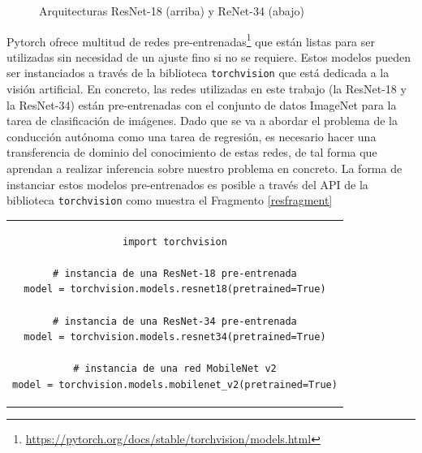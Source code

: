 \begin{figure}
	\begin{center}
		\hspace{0.1cm}
	\end{center}
	\centering
	\captionsetup{justification=centering,margin=2cm}
	\caption{Arquitecturas ResNet-18 (arriba) y ReNet-34 (abajo)}
	\label{fig:resnets}
\end{figure}

Pytorch ofrece multitud de redes pre-entrenadas\footnote{\url{https://pytorch.org/docs/stable/torchvision/models.html}} que están listas para ser utilizadas sin necesidad de un ajuste fino si no se requiere. Estos modelos pueden ser instanciados a través de la biblioteca \texttt{torchvision} que está dedicada a la visión artificial. En concreto, las redes utilizadas en este trabajo (la ResNet-18 y la ResNet-34) están pre-entrenadas con el conjunto de datos ImageNet para la tarea de clasificación de imágenes. Dado que se va a abordar el problema de la conducción autónoma como una tarea de regresión, es necesario hacer una transferencia de dominio del conocimiento de estas redes, de tal forma que aprendan a realizar inferencia sobre nuestro problema en concreto. La forma de instanciar estos modelos pre-entrenados es posible a través del API de la biblioteca \texttt{torchvision} como muestra el Fragmento \ref{resfragment}

\begin{tabular}{c}
\begin{lstlisting}[caption={Ejemplo de instanciación de diferentes modelos pre-entrenados.},captionpos=b,label=resfragment,style=Python] 
import torchvision

# instancia de una ResNet-18 pre-entrenada
model = torchvision.models.resnet18(pretrained=True)

# instancia de una ResNet-34 pre-entrenada
model = torchvision.models.resnet34(pretrained=True)

# instancia de una red MobileNet v2
model = torchvision.models.mobilenet_v2(pretrained=True)

\end{lstlisting}
\end{tabular}

